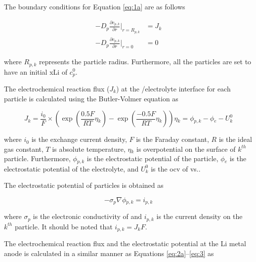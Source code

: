 \documentclass{article}
\begin{document}
The boundary conditions for Equation \ref{eq:1a} are as
follows\cite{newman1993,newman1994}

\begin{subequations}
    \begin{align}
      -D_p\frac{\partial c_{p,k}}{\partial r}\left.\right|_{r=R_{p,k}} &= J_{k} \label{eq:1b} \\
      -D_p\frac{\partial c_{p,k}}{\partial r}\left.\right|_{r=0} &= 0 \label{eq:1c}
    \end{align}
\end{subequations}

where $R_{p,k}$ represents the particle radius. Furthermore, all the
particles are set to have an initial \gls{xLi} of $c_p^0$.

The electrochemical reaction flux ($J_k$) at the \nca{}/electrolyte
interface for each particle is calculated using the Butler-Volmer
equation as\cite{newman1993,newman1994}

\begin{subequations}
\begin{equation}
  J_k = \frac{i_0}{F}\times\left(\exp \left(\frac{0.5F}{RT}\eta{}_k\right)-\exp
  \left(\frac{-0.5F}{RT}\eta{}_k\right)\right)
  \label{eq:2a}
\end{equation}
\begin{equation}
  \eta{}_k=\phi{}_{p,k}-\phi{}_e-U_k^0
  \label{eq:2b}
\end{equation}
\end{subequations}

where $i_0$ is the exchange current density, $F$ is the Faraday
constant, $R$ is the ideal gas constant, $T$ is absolute temperature,
$\eta{}_k$ is overpotential on the surface of $k^{\mathit{th}}$
particle. Furthermore, $\phi{}_{p,k}$ is the electrostatic potential of the
particle, $\phi{}_e$ is the electrostatic potential of the electrolyte, and
$U_k^0$ is the \gls{ocv} of \nca{} vs..

The electrostatic potential of \nca{} particles is obtained as\cite{newman1993,newman1994}

\begin{equation}
  -\sigma{}_p\nabla{}\phi{}_{p,k}=i_{p,k}
  \label{eq:3}
\end{equation}

where $\sigma{}_p$ is the electronic conductivity of \nca{} and $i_{p,k}$ is
the current density on the $k^{\mathit{th}}$ particle. It should be
noted that $i_{p,k}=J_kF$.

The electrochemical reaction flux and the electrostatic potential at
the Li metal anode is calculated in a similar manner as Equations
\ref{eq:2a}--\ref{eq:3} as\cite{dasgupta2016}
\end{document}

